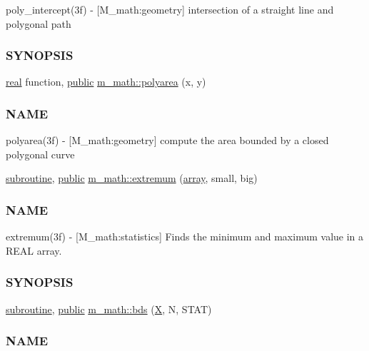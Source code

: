 \begin{DoxyCompactItemize}
\begin{DoxyCompactList}
poly\+\_\+intercept(3f) -\/ \mbox{[}M\+\_\+math\+:geometry\mbox{]} intersection of a straight line and polygonal path \subsubsection*{S\+Y\+N\+O\+P\+S\+IS}\end{DoxyCompactList}\item 
\hyperlink{read__watch_83_8txt_abdb62bde002f38ef75f810d3a905a823}{real} function, \hyperlink{M__stopwatch_83_8txt_a2f74811300c361e53b430611a7d1769f}{public} \hyperlink{namespacem__math_a2324f10703d77ef5fde6f502ac3e65f6}{m\+\_\+math\+::polyarea} (x, y)
\begin{DoxyCompactList}\small\item\em \subsubsection*{N\+A\+ME}

polyarea(3f) -\/ \mbox{[}M\+\_\+math\+:geometry\mbox{]} compute the area bounded by a closed polygonal curve \end{DoxyCompactList}\item 
\hyperlink{M__stopwatch_83_8txt_acfbcff50169d691ff02d4a123ed70482}{subroutine}, \hyperlink{M__stopwatch_83_8txt_a2f74811300c361e53b430611a7d1769f}{public} \hyperlink{namespacem__math_a70e89987b4dfc6f42864fb9c6907b5b1}{m\+\_\+math\+::extremum} (\hyperlink{intro__blas1_83_8txt_a89db1945e1a335ab0184c6a097821e32}{array}, small, big)
\begin{DoxyCompactList}\small\item\em \subsubsection*{N\+A\+ME}

extremum(3f) -\/ \mbox{[}M\+\_\+math\+:statistics\mbox{]} Finds the minimum and maximum value in a R\+E\+AL array. \subsubsection*{S\+Y\+N\+O\+P\+S\+IS}\end{DoxyCompactList}\item 
\hyperlink{M__stopwatch_83_8txt_acfbcff50169d691ff02d4a123ed70482}{subroutine}, \hyperlink{M__stopwatch_83_8txt_a2f74811300c361e53b430611a7d1769f}{public} \hyperlink{namespacem__math_a5298e196ca91a45fd9cff36e1b8e188a}{m\+\_\+math\+::bds} (\hyperlink{intro__blas1_83_8txt_ac8596739bc875e90fe6e2ecf98e87906}{X}, N, S\+T\+AT)
\begin{DoxyCompactList}\small\item\em \subsubsection*{N\+A\+ME}


\end{DoxyCompactList}
\end{DoxyCompactItemize}

